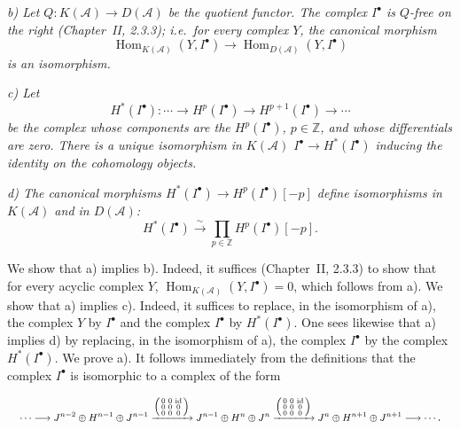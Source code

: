 \clearpage
{}%
\begingroup\small\setlength{\parskip}{0pt}\setlength{\emergencystretch}{1.5em}
\setlength{\abovedisplayskip}{4pt plus 2pt minus 2pt}%
\setlength{\belowdisplayskip}{4pt plus 2pt minus 2pt}%

\noindent\textit{b) Let
$Q\colon K(\mathcal A)\longrightarrow D(\mathcal A)$ be the quotient
functor. The complex $I^\bullet$ is $Q$-free on the right (Chapter~II,
2.3.3); i.e.\ for every complex $Y$, the canonical morphism}
\[
\operatorname{Hom}_{K(\mathcal A)}(Y,I^\bullet)
\longrightarrow\operatorname{Hom}_{D(\mathcal A)}(Y,I^\bullet)
\]
\textit{is an isomorphism.}

\noindent\textit{c) Let}
\[
H^*(I^\bullet)\colon\cdots\longrightarrow H^p(I^\bullet)
\longrightarrow H^{p+1}(I^\bullet)\longrightarrow\cdots
\]
\textit{be the complex whose components are the $H^p(I^\bullet)$,
$p\in\mathbb Z$, and whose differentials are zero. There is a unique
isomorphism in $K(\mathcal A)$
$I^\bullet\longrightarrow H^*(I^\bullet)$ inducing the identity on the
cohomology objects.}

\noindent\textit{d) The canonical morphisms
$H^*(I^\bullet)\longrightarrow H^p(I^\bullet)[-p]$ define isomorphisms in
$K(\mathcal A)$ and in $D(\mathcal A)$:}
\[
H^*(I^\bullet)\xrightarrow{\sim}
\prod_{p\in\mathbb Z}H^p(I^\bullet)[-p].
\]

We show that a) implies b). Indeed, it suffices (Chapter~II, 2.3.3) to show
that for every acyclic complex $Y$,
$\operatorname{Hom}_{K(\mathcal A)}(Y,I^\bullet)=0$, which follows from a).
We show that a) implies c). Indeed, it suffices to replace, in the
isomorphism of a), the complex $Y$ by $I^\bullet$ and the complex
$I^\bullet$ by $H^*(I^\bullet)$. One sees likewise that a) implies d) by
replacing, in the isomorphism of a), the complex $I^\bullet$ by the complex
$H^*(I^\bullet)$. We prove a). It follows immediately from the definitions
that the complex $I^\bullet$ is isomorphic to a complex of the form

\[
\resizebox{0.98\linewidth}{!}{$
\displaystyle
\cdots\longrightarrow
J^{n-2}\oplus H^{n-1}\oplus J^{n-1}
\xrightarrow{\left(\begin{smallmatrix}
0&0&\mathrm{id}\\0&0&0\\0&0&0
\end{smallmatrix}\right)}
J^{n-1}\oplus H^n\oplus J^n
\xrightarrow{\left(\begin{smallmatrix}
0&0&\mathrm{id}\\0&0&0\\0&0&0
\end{smallmatrix}\right)}
J^n\oplus H^{n+1}\oplus J^{n+1}
\longrightarrow\cdots
$}.
\]

